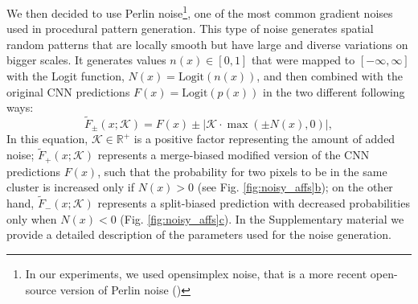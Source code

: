  We then decided to use Perlin noise\footnote{In our experiments, we used opensimplex noise, that is a more recent open-source version of Perlin noise ()}, one of the most common gradient noises used in procedural pattern generation. This type of noise generates spatial random patterns that are locally smooth but have large and diverse variations on bigger scales. It generates values $n(x)\in[0,1]$ that were mapped to $[-\infty, \infty]$ with the Logit function, $N(x)=\mathrm{Logit}(n(x))$, and then combined with the original CNN predictions $F(x)=\mathrm{Logit}(p(x))$ in the two different following ways:
\begin{equation}
\tilde{F}_{\pm}(x;\mathcal{K})=F(x)\pm\big|\mathcal{K}\cdot\max\left(\pm N(x),0\right)\big|,
\end{equation}
In this equation, $\mathcal{K}\in \mathbb{R}^+$ is a positive factor representing the amount of added noise; $\tilde{F}_{+}(x;\mathcal{K})$ represents a merge-biased modified version of the CNN predictions $F(x)$, such that the probability for two pixels to be in the same cluster is increased only if $N(x)>0$ (see Fig. \hyperref[fig:noisy_affs]{\ref*{fig:noisy_affs}b}); on the other hand, $\tilde{F}_{-}(x;\mathcal{K})$ represents a split-biased prediction with decreased probabilities only when $N(x)<0$ (Fig. \hyperref[fig:noisy_affs]{\ref*{fig:noisy_affs}c}). In the Supplementary material we provide a detailed description of the parameters used for the noise generation.

